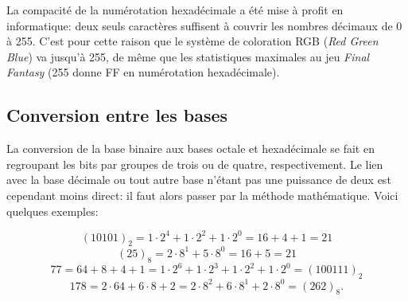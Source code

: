 \documentclass[canadien,12pt,oneside,letterpaper]{article}
\begin{document}
La compacité de la numérotation hexadécimale a été mise à profit en informatique: deux seuls caractères suffisent à couvrir les nombres décimaux de 0 à 255. C'est pour cette raison que le système de coloration RGB (\textit{Red Green Blue}) va jusqu'à 255, de même que les statistiques maximales au jeu \textit{Final Fantasy} (255 donne FF en numérotation hexadécimale).


\subsection{Conversion entre les bases}

La conversion de la base binaire aux bases octale et hexadécimale se fait en regroupant les bits par groupes de trois ou de quatre, respectivement. Le lien avec la base décimale ou tout autre base n'étant pas une puissance de deux est cependant moins direct: il faut alors passer par la méthode mathématique. Voici quelques exemples:

\begin{equation*}
\left(10101\right)_2=1\cdot2^4+1\cdot2^2+1\cdot2^0=16+4+1=21
\end{equation*}
\begin{equation*}
\left(25\right)_8=2\cdot8^1+5\cdot8^0=16+5=21
\end{equation*}
\begin{equation*}
77=64+8+4+1=1\cdot2^6+1\cdot2^3+1\cdot2^2+1\cdot2^0=\left(100111\right)_2
\end{equation*}
\begin{equation*}
178=2\cdot64+6\cdot8+2=2\cdot8^2+6\cdot8^1+2\cdot8^0=\left(262\right)_8.
\end{equation*}
\end{document}
